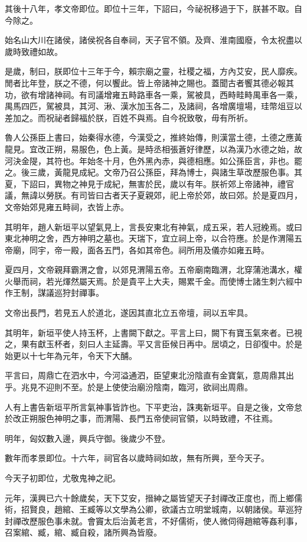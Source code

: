 其後十八年，孝文帝即位。即位十三年，下詔曰，今祕祝移過于下，朕甚不取。自今除之。

始名山大川在諸侯，諸侯祝各自奉祠，天子官不領。及齊、淮南國廢，令太祝盡以歲時致禮如故。

是歲，制曰，朕即位十三年于今，賴宗廟之靈，社稷之福，方內艾安，民人靡疾。閒者比年登，朕之不德，何以饗此。皆上帝諸神之賜也。蓋聞古者饗其德必報其功，欲有增諸神祠。有司議增雍五畤路車各一乘，駕被具，西畤畦畤禺車各一乘，禺馬四匹，駕被具，其河、湫、漢水加玉各二，及諸祠，各增廣壇場，珪幣俎豆以差加之。而祝祕者歸福於朕，百姓不與焉。自今祝致敬，毋有所祈。

魯人公孫臣上書曰，始秦得水德，今漢受之，推終始傳，則漢當土德，土德之應黃龍見。宜改正朔，易服色，色上黃。是時丞相張蒼好律歷，以為漢乃水德之始，故河決金隄，其符也。年始冬十月，色外黑內赤，與德相應。如公孫臣言，非也。罷之。後三歲，黃龍見成紀。文帝乃召公孫臣，拜為博士，與諸生草改歷服色事。其夏，下詔曰，異物之神見于成紀，無害於民，歲以有年。朕祈郊上帝諸神，禮官議，無諱以勞朕。有司皆曰古者天子夏親郊，祀上帝於郊，故曰郊。於是夏四月，文帝始郊見雍五畤祠，衣皆上赤。

其明年，趙人新垣平以望氣見上，言長安東北有神氣，成五采，若人冠絻焉。或曰東北神明之舍，西方神明之墓也。天瑞下，宜立祠上帝，以合符應。於是作渭陽五帝廟，同宇，帝一殿，面各五門，各如其帝色。祠所用及儀亦如雍五畤。

夏四月，文帝親拜霸渭之會，以郊見渭陽五帝。五帝廟南臨渭，北穿蒲池溝水，權火舉而祠，若光煇然屬天焉。於是貴平上大夫，賜累千金。而使博士諸生刺六經中作王制，謀議巡狩封禪事。

文帝出長門，若見五人於道北，遂因其直北立五帝壇，祠以五牢具。

其明年，新垣平使人持玉杯，上書闕下獻之。平言上曰，闕下有寶玉氣來者。已視之，果有獻玉杯者，刻曰人主延壽。平又言臣候日再中。居頃之，日卻復中。於是始更以十七年為元年，令天下大酺。

平言曰，周鼎亡在泗水中，今河溢通泗，臣望東北汾陰直有金寶氣，意周鼎其出乎。兆見不迎則不至。於是上使使治廟汾陰南，臨河，欲祠出周鼎。

人有上書告新垣平所言氣神事皆詐也。下平吏治，誅夷新垣平。自是之後，文帝怠於改正朔服色神明之事，而渭陽、長門五帝使祠官領，以時致禮，不往焉。

明年，匈奴數入邊，興兵守御。後歲少不登。

數年而孝景即位。十六年，祠官各以歲時祠如故，無有所興，至今天子。

今天子初即位，尤敬鬼神之祀。

元年，漢興已六十餘歲矣，天下艾安，搢紳之屬皆望天子封禪改正度也，而上鄉儒術，招賢良，趙綰、王臧等以文學為公卿，欲議古立明堂城南，以朝諸侯。草巡狩封禪改歷服色事未就。會竇太后治黃老言，不好儒術，使人微伺得趙綰等姦利事，召案綰、臧，綰、臧自殺，諸所興為皆廢。

